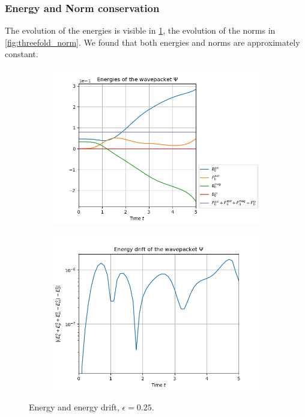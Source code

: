 \documentclass[11pt, a4paper, oneside]{article}
\begin{document}
\subsubsection{Energy and Norm conservation}
The evolution of the energies is visible in \cref{fig:threefold_energy}, the evolution of the norms in \cref{fig:threefold_norm}. We found that both energies and norms are approximately constant.
\begin{figure}[h]
  \begin{subfigure}[b]{0.45 \textwidth}
    \includegraphics[width = \textwidth]{graphics/threefold_morse/threefold_energies_block0.PNG}
  \end{subfigure}
  \hfill
  \begin{subfigure}[b]{0.45 \textwidth}
    \includegraphics[width = \textwidth]{graphics/threefold_morse/energy_drift_block0_log.PNG}
  \end{subfigure}
  \caption{Energy and energy drift, $\epsilon = 0.25$.}
  \label{fig:threefold_energy}
\end{figure}
\end{document}
